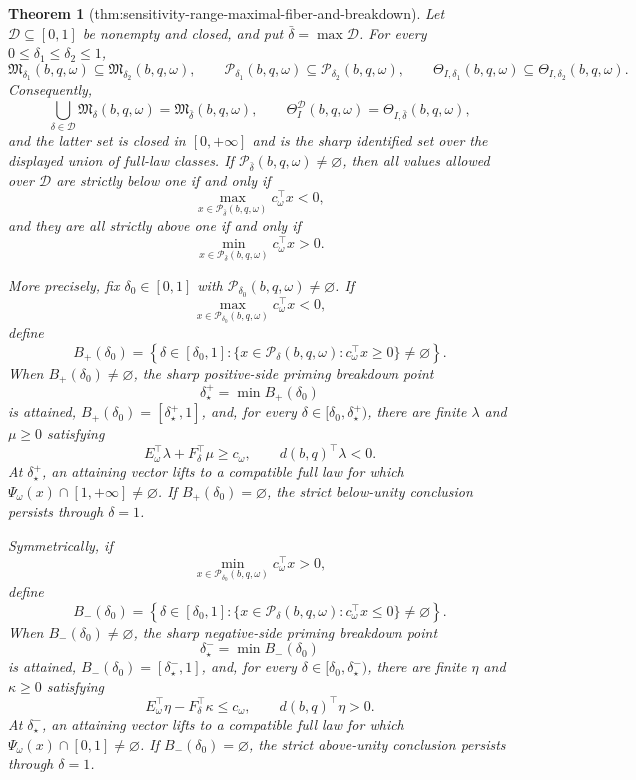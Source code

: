 \documentclass{article}
\newtheorem{theorem}{Theorem}
\begin{document}
\begin{theorem}[thm:sensitivity-range-maximal-fiber-and-breakdown]\label{thm:sensitivity-range-maximal-fiber-and-breakdown}
Let \(\mathcal D\subseteq[0,1]\) be nonempty and closed, and put \(\bar\delta=\max\mathcal D\).  For every \(0\leq\delta_1\leq\delta_2\leq1\),
\[
 \mathfrak M_{\delta_1}(b,q,\omega)
 \subseteq \mathfrak M_{\delta_2}(b,q,\omega),\qquad
 \mathcal P_{\delta_1}(b,q,\omega)
 \subseteq \mathcal P_{\delta_2}(b,q,\omega),
 \qquad
 \Theta_{I,\delta_1}(b,q,\omega)
 \subseteq \Theta_{I,\delta_2}(b,q,\omega).
\]
Consequently,
\[
 \bigcup_{\delta\in\mathcal D}\mathfrak M_\delta(b,q,\omega)
 =\mathfrak M_{\bar\delta}(b,q,\omega),
 \qquad
 \Theta_I^{\mathcal D}(b,q,\omega)
 =\Theta_{I,\bar\delta}(b,q,\omega),
\]
and the latter set is closed in \([0,+\infty]\) and is the sharp identified set over the displayed union of full-law classes.  If \(\mathcal P_{\bar\delta}(b,q,\omega)\neq\varnothing\), then all values allowed over \(\mathcal D\) are strictly below one if and only if
\[
 \max_{x\in\mathcal P_{\bar\delta}(b,q,\omega)}c_\omega^{\top}x<0,
\]
and they are all strictly above one if and only if
\[
 \min_{x\in\mathcal P_{\bar\delta}(b,q,\omega)}c_\omega^{\top}x>0.
\]

More precisely, fix \(\delta_0\in[0,1]\) with \(\mathcal P_{\delta_0}(b,q,\omega)\neq\varnothing\).  If
\[
 \max_{x\in\mathcal P_{\delta_0}(b,q,\omega)}c_\omega^{\top}x<0,
\]
define
\[
 B_+(\delta_0)=
 \left\{\delta\in[\delta_0,1]:
 \{x\in\mathcal P_\delta(b,q,\omega):c_\omega^{\top}x\geq0\}
 \neq\varnothing\right\}.
\]
When \(B_+(\delta_0)\neq\varnothing\), the sharp positive-side priming breakdown point
\[
 \delta_\star^+=\min B_+(\delta_0)
\]
is attained, \(B_+(\delta_0)=[\delta_\star^+,1]\), and, for every \(\delta\in[\delta_0,\delta_\star^+)\), there are finite \(\lambda\) and \(\mu\geq0\) satisfying
\[
 E_\omega^{\top}\lambda+F_\delta^{\top}\mu\geq c_\omega,
 \qquad d(b,q)^{\top}\lambda<0.
\]
At \(\delta_\star^+\), an attaining vector lifts to a compatible full law for which \(\Psi_\omega(x)\cap[1,+\infty]\neq\varnothing\).  If \(B_+(\delta_0)=\varnothing\), the strict below-unity conclusion persists through \(\delta=1\).

Symmetrically, if
\[
 \min_{x\in\mathcal P_{\delta_0}(b,q,\omega)}c_\omega^{\top}x>0,
\]
define
\[
 B_-(\delta_0)=
 \left\{\delta\in[\delta_0,1]:
 \{x\in\mathcal P_\delta(b,q,\omega):c_\omega^{\top}x\leq0\}
 \neq\varnothing\right\}.
\]
When \(B_-(\delta_0)\neq\varnothing\), the sharp negative-side priming breakdown point
\[
 \delta_\star^-=\min B_-(\delta_0)
\]
is attained, \(B_-(\delta_0)=[\delta_\star^-,1]\), and, for every \(\delta\in[\delta_0,\delta_\star^-)\), there are finite \(\eta\) and \(\kappa\geq0\) satisfying
\[
 E_\omega^{\top}\eta-F_\delta^{\top}\kappa\leq c_\omega,
 \qquad d(b,q)^{\top}\eta>0.
\]
At \(\delta_\star^-\), an attaining vector lifts to a compatible full law for which \(\Psi_\omega(x)\cap[0,1]\neq\varnothing\).  If \(B_-(\delta_0)=\varnothing\), the strict above-unity conclusion persists through \(\delta=1\).


\end{theorem}
\end{document}
